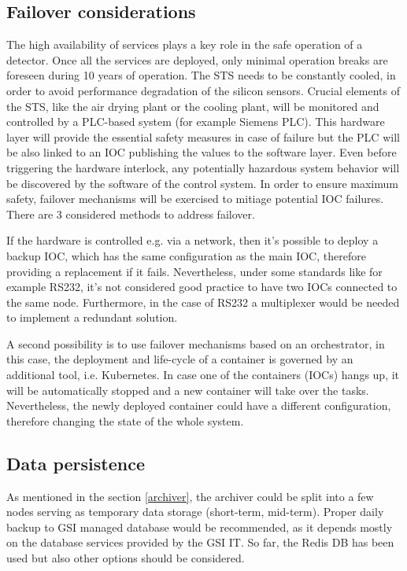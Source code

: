 \subsection{Failover considerations}
The high availability of services plays a key role in the safe operation of a detector. Once all the services are deployed, only minimal operation breaks are foreseen during 10 years of operation. The STS needs to be constantly cooled, in order to avoid performance degradation of the silicon sensors.
Crucial elements of the STS, like the air drying plant or the cooling plant, will be monitored and controlled by a PLC-based system (for example Siemens PLC). This hardware layer will provide the essential safety measures in case of failure but the PLC will be also linked to an IOC publishing the values to the software layer. Even before triggering the hardware interlock, any potentially hazardous system behavior will be discovered by the software of the control system. In order to ensure maximum safety, failover mechanisms will be exercised to mitiage potential IOC failures. There are 3 considered methods to address failover. 


If the hardware is controlled e.g. via a network, then it's possible to deploy a backup IOC, which has the same configuration as the main IOC, therefore providing a replacement if it fails. Nevertheless, under some standards like for example RS232, it's not considered good practice to have two IOCs connected to the same node. Furthermore, in the case of RS232 a multiplexer would be needed to implement a redundant solution. 

A second possibility is to use failover mechanisms based on an orchestrator, in this case, the deployment and life-cycle of a container is governed by an additional tool, i.e. Kubernetes. In case one of the containers (IOCs) hangs up, it will be automatically stopped and a new container will take over the tasks. Nevertheless, the newly deployed container could have a different configuration, therefore changing the state of the whole system. 


\subsection{Data persistence}

As mentioned in the section \ref{archiver}, the archiver could be split into a few nodes serving as temporary data storage (short-term, mid-term). Proper daily backup to GSI managed database would be recommended, as it depends mostly on the database services provided by the GSI IT. So far, the Redis DB has been used but also other options should be considered. 

